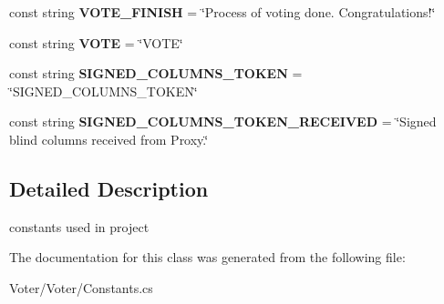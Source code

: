 \begin{DoxyCompactItemize}
\item 
\hypertarget{class_voter_1_1_constants_a371c798b73fd3a0f171cf305b3933234}{}const string {\bfseries V\+O\+T\+E\+\_\+\+F\+I\+N\+I\+S\+H} = \char`\"{}Process of voting done. Congratulations!\char`\"{}\label{class_voter_1_1_constants_a371c798b73fd3a0f171cf305b3933234}

\item 
\hypertarget{class_voter_1_1_constants_acdb932f4cb9d2930c778827b0d951f68}{}const string {\bfseries V\+O\+T\+E} = \char`\"{}V\+O\+T\+E\char`\"{}\label{class_voter_1_1_constants_acdb932f4cb9d2930c778827b0d951f68}

\item 
\hypertarget{class_voter_1_1_constants_afce310d7e6952d413ab0c0a68bada603}{}const string {\bfseries S\+I\+G\+N\+E\+D\+\_\+\+C\+O\+L\+U\+M\+N\+S\+\_\+\+T\+O\+K\+E\+N} = \char`\"{}S\+I\+G\+N\+E\+D\+\_\+\+C\+O\+L\+U\+M\+N\+S\+\_\+\+T\+O\+K\+E\+N\char`\"{}\label{class_voter_1_1_constants_afce310d7e6952d413ab0c0a68bada603}

\item 
\hypertarget{class_voter_1_1_constants_af659d57d2863319885cb4ac25de23cf8}{}const string {\bfseries S\+I\+G\+N\+E\+D\+\_\+\+C\+O\+L\+U\+M\+N\+S\+\_\+\+T\+O\+K\+E\+N\+\_\+\+R\+E\+C\+E\+I\+V\+E\+D} = \char`\"{}Signed blind columns received from Proxy.\char`\"{}\label{class_voter_1_1_constants_af659d57d2863319885cb4ac25de23cf8}

\end{DoxyCompactItemize}


\subsection{Detailed Description}
constants used in project 



The documentation for this class was generated from the following file\+:\begin{DoxyCompactItemize}
\item 
Voter/\+Voter/Constants.\+cs\end{DoxyCompactItemize}

